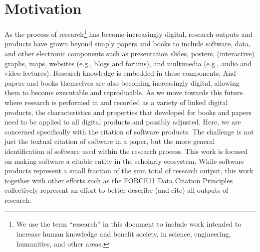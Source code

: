\documentclass[12pt, oneside]{amsart}
\begin{document}
\section{Motivation}
\label{sec:intro}

As the process of research\footnote{We use the term ``research'' in this document to include work intended to increase human knowledge and benefit society, in science, engineering, humanities, and other areas.} has become increasingly digital, research outputs
and products have grown beyond simply papers and books to include software,
data, and other electronic components such as presentation slides, posters,
(interactive) graphs, maps, websites (e.g., blogs and forums), and multimedia
(e.g., audio and  video lectures).  Research knowledge is embedded in these
components. And papers and books themselves are also becoming increasingly
digital, allowing them to become executable and reproducible. As we move towards
this future where research is performed in and recorded as a variety of linked
digital products, the characteristics and properties that developed for books
and papers need to be applied to all digital products and possibly adjusted.
Here, we are concerned specifically with the citation of software products. The
challenge is not just the textual citation of software in a paper, but the more
general identification of software used within the research process. This work is
focused on making software a citable entity in the scholarly ecosystem. While
software products represent a small fraction of the sum total of
research output, this work together with other efforts such as the FORCE11
Data Citation Principles~\cite{data-citation-principles,10.7717/peerj-cs.1}
collectively represent an effort to better describe (and cite) all outputs of
research.
\end{document}
